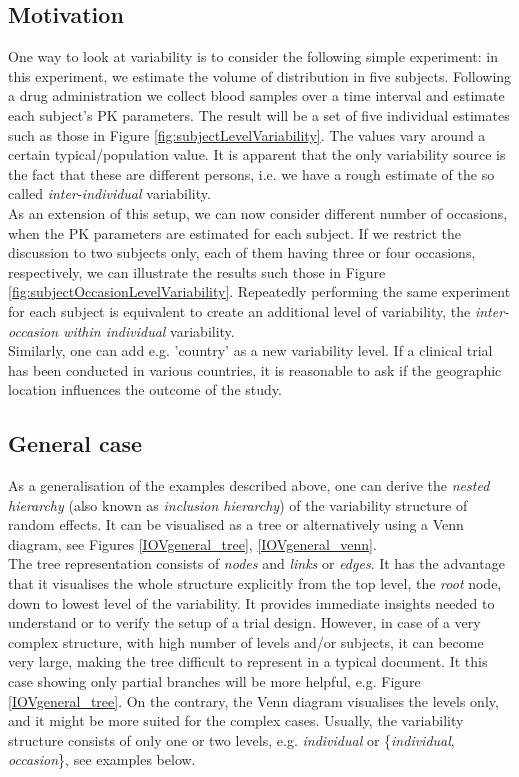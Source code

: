 \subsection{Motivation}
One way to look at variability is to consider the following simple experiment: in this experiment, we estimate the volume of distribution in five subjects. Following a drug administration we collect blood samples over a time interval and estimate each subject's PK parameters. The result will be a set of five individual estimates such as those in Figure \ref{fig:subjectLevelVariability}. The values vary around a certain typical/population value. It is apparent that the only variability source is the fact that these are different persons, i.e. we have a rough estimate of the so called \textit{inter-individual} variability.\\
As an extension of this setup, we can now consider different number of occasions, when the PK parameters are estimated for each subject. If we restrict the discussion to two subjects only, each of them having three or four occasions, respectively, we can illustrate the results such those in Figure \ref{fig:subjectOccasionLevelVariability}. Repeatedly performing the same experiment for each subject is equivalent to create an additional level of variability, the \textit{inter-occasion within individual} variability.\\ 
Similarly, one can add e.g. 'country' as a new variability level. If a clinical trial has been conducted in various countries, it is reasonable to ask if the geographic location influences the outcome of the study. 

\subsection{General case}
As a generalisation of the examples described above, one can derive the \textit{nested hierarchy} (also known as \textit{inclusion hierarchy}) of the variability structure of random effects. It can be visualised as a tree or alternatively using a Venn diagram, see Figures \ref{IOVgeneral_tree}, \ref{IOVgeneral_venn}. \\
The tree representation consists of \textit{nodes} and \textit{links} or \textit{edges}. It has the advantage that it visualises the whole structure explicitly from the top level, the \textit{root} node, down to lowest level of the variability. It provides immediate insights needed to understand or to verify the setup of a trial design. However, in case of a very complex structure, with high number of levels and/or subjects, it can become very large, making the tree difficult to represent in a typical document. It this case showing only partial branches will be more helpful, e.g. Figure \ref{IOVgeneral_tree}. On the contrary, the Venn diagram visualises the levels only, and it might be more suited for the complex cases. Usually, the variability structure consists of only one or two levels, e.g. \textit{individual} or  \{\textit{individual}, \textit{occasion}\}, see examples below. 



